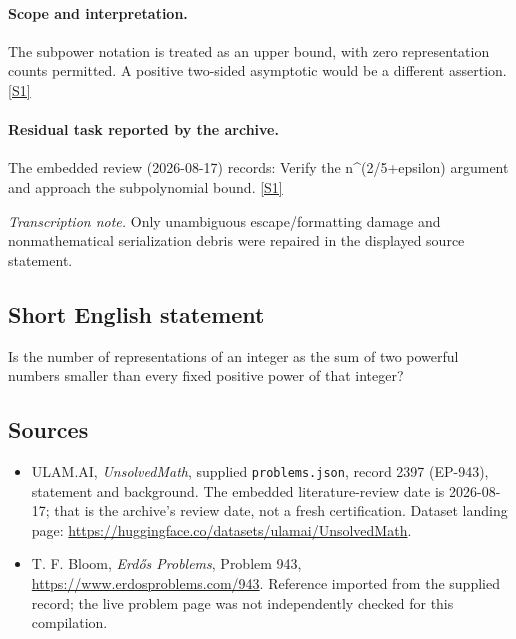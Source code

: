 \documentclass[11pt,a4paper]{article}
\newcommand{\sref}[2]{\hyperlink{source:#1:#2}{[S#2]}}
\begin{document}
\paragraph{Scope and interpretation.}

The subpower notation is treated as an upper bound, with zero representation counts permitted. A positive two-sided asymptotic would be a different assertion. \sref{2397}{1}

\paragraph{Residual task reported by the archive.}

The embedded review (2026-08-17) records: Verify the n\textasciicircum{}(2/5+epsilon) argument and approach the subpolynomial bound. \sref{2397}{1}

{\small\emph{Transcription note.} Only unambiguous escape/formatting damage and nonmathematical serialization debris were repaired in the displayed source statement.}

\subsection{Short English statement}

Is the number of representations of an integer as the sum of two powerful numbers smaller than every fixed positive power of that integer?

\subsection{Sources}

{\small

\begin{itemize}

\item[\hypertarget{source:2397:1}{S1}] ULAM.AI, \emph{UnsolvedMath}, supplied \texttt{problems.json}, record 2397 (EP-943), statement and background. The embedded literature-review date is 2026-08-17; that is the archive’s review date, not a fresh certification. Dataset landing page: \url{https://huggingface.co/datasets/ulamai/UnsolvedMath}.

\item[\hypertarget{source:2397:2}{S2}] T. F. Bloom, \emph{Erdős Problems}, Problem 943, \url{https://www.erdosproblems.com/943}. Reference imported from the supplied record; the live problem page was not independently checked for this compilation.

\end{itemize}

}

\label{end:2397}
\end{document}
